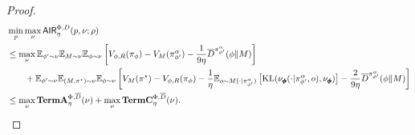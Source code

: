 \begin{proof}
    \begin{align*}   
        &\min_p \max_\nu \mathsf{AIR}_\eta^{\Phi, D}(p, \nu; \rho) 
        \\&\le \max_\nu \mathbb{E}_{\phi'\sim \nu}\mathbb{E}_{M \sim \nu}\mathbb{E}_{\phi \sim \nu}\left[  V_{\phi, R}(\pi_{\phi}) - V_M(\pi_{\phi'}^\alpha) - \frac{1}{9\eta} \overline{D}^{\pi_{\phi'}^\alpha}(\phi\|M)\right]
    \\& \qquad + \mathbb{E}_{\phi'\sim \nu}\mathbb{E}_{(M, \pi^\star) \sim \nu}\mathbb{E}_{\phi \sim \nu}\left[ V_M(\pi^\star) - V_{\phi, R}(\pi_{\phi}) - \frac{1}{\eta}\mathbb{E}_{o\sim M(\cdot|\pi_{\phi'}^\alpha)}\left[\text{KL}(\nu_{\pmb{\phi}}(\cdot|\pi_{\phi'}^\alpha, o), \nu_{\pmb{\phi}})\right] - \frac{2}{9\eta} \overline{D}^{\pi_{\phi'}^\alpha}(\phi\|M)\right] 
    \\&\leq \max_\nu \textbf{\textup{TermA}}_\eta^{\Phi, \overline{D}}(\nu) + \max_\nu \textbf{\textup{TermC}}_\eta^{\Phi, \overline{D}}(\nu).  
    \end{align*}
\end{proof}


